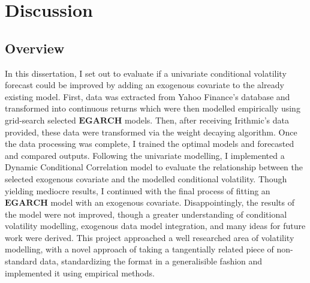 \chapter{Discussion}
\label{ch:Discussion}
\section{Overview}
In this dissertation, I set out to evaluate if a univariate conditional volatility forecast could be improved by adding an exogenous covariate to the already existing model. First, data was extracted from Yahoo Finance's database and transformed into continuous returns which were then modelled empirically using grid-search selected $\mathbf{EGARCH}$ models. Then, after receiving Irithmic's data provided, these data were transformed via the weight decaying algorithm. Once the data processing was complete, I trained the optimal models and forecasted and compared outputs. Following the univariate modelling, I implemented a Dynamic Conditional Correlation model to evaluate the relationship between the selected exogenous covariate and the modelled conditional volatility. Though yielding mediocre results, I continued with the final process of fitting an $\mathbf{EGARCH}$ model with an exogenous covariate. Disappointingly, the results of the model were not improved, though a greater understanding of conditional volatility modelling, exogenous data model integration, and many ideas for future work were derived. This project approached a well researched area of volatility modelling, with a novel approach of taking a tangentially related piece of non-standard data, standardizing the format in a generalisible fashion and implemented it using empirical methods.  


